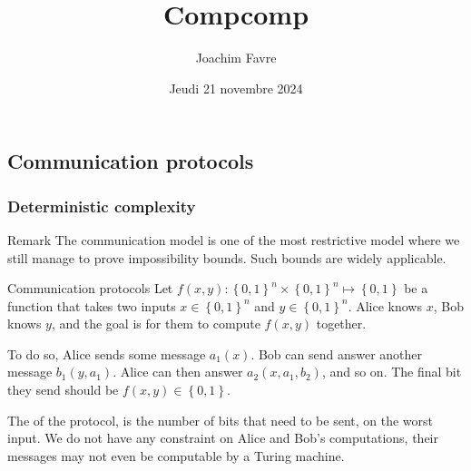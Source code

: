 \documentclass[a4paper]{article}
\title{Compcomp}
\author{Joachim Favre}
\date{Jeudi 21 novembre 2024}
\begin{document}
\maketitle


\subsection{Communication protocols}

\subsubsection{Deterministic complexity}

\begin{parag}{Remark}
    The communication model is one of the most restrictive model where we still manage to prove impossibility bounds. Such bounds are widely applicable.
\end{parag}

\begin{parag}{Communication protocols}
    Let $f\left(x, y\right): \left\{0,1 \right\}^n \times \left\{0, 1\right\}^n \mapsto \left\{0, 1\right\}$ be a function that takes two inputs $x \in \left\{0, 1\right\}^n$ and $y \in \left\{0, 1\right\}^n$. Alice knows $x$, Bob knows $y$, and the goal is for them to compute $f\left(x, y\right)$ together.

    To do so, Alice sends some message $a_1\left(x\right)$. Bob can send answer another message $b_1\left(y, a_1\right)$. Alice can then answer $a_2\left(x, a_1, b_2\right)$, and so on. The final bit they send should be $f\left(x, y\right) \in \left\{0, 1\right\}$.

    The  of the protocol, is the number of bits that need to be sent, on the worst input. We do not have any constraint on Alice and Bob's computations, their messages may not even be computable by a Turing machine.
\end{parag}
\end{document}
